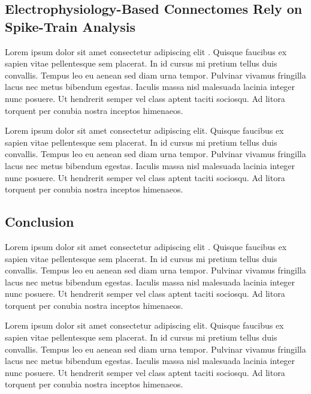 \documentclass[11pt]{article}
\newcommand{\subsectionwithindent}[1]{
    \subsection*{#1}
    \hspace{\parindent} %
}
\begin{document}
\subsectionwithindent{Electrophysiology-Based Connectomes Rely on Spike-Train Analysis}
Lorem ipsum dolor sit amet consectetur adipiscing elit \cite{white1986structure, emmons2015connectomics}. Quisque faucibus ex sapien vitae pellentesque sem placerat. In id cursus mi pretium tellus duis convallis. Tempus leo eu aenean sed diam urna tempor. Pulvinar vivamus fringilla lacus nec metus bibendum egestas. Iaculis massa nisl malesuada lacinia integer nunc posuere. Ut hendrerit semper vel class aptent taciti sociosqu. Ad litora torquent per conubia nostra inceptos himenaeos.

Lorem ipsum dolor sit amet consectetur adipiscing elit. Quisque faucibus ex sapien vitae pellentesque sem placerat. In id cursus mi pretium tellus duis convallis. Tempus leo eu aenean sed diam urna tempor. Pulvinar vivamus fringilla lacus nec metus bibendum egestas. Iaculis massa nisl malesuada lacinia integer nunc posuere. Ut hendrerit semper vel class aptent taciti sociosqu. Ad litora torquent per conubia nostra inceptos himenaeos.

\subsectionwithindent{Conclusion}
Lorem ipsum dolor sit amet consectetur adipiscing elit \cite{white1986structure, emmons2015connectomics}. Quisque faucibus ex sapien vitae pellentesque sem placerat. In id cursus mi pretium tellus duis convallis. Tempus leo eu aenean sed diam urna tempor. Pulvinar vivamus fringilla lacus nec metus bibendum egestas. Iaculis massa nisl malesuada lacinia integer nunc posuere. Ut hendrerit semper vel class aptent taciti sociosqu. Ad litora torquent per conubia nostra inceptos himenaeos.

Lorem ipsum dolor sit amet consectetur adipiscing elit. Quisque faucibus ex sapien vitae pellentesque sem placerat. In id cursus mi pretium tellus duis convallis. Tempus leo eu aenean sed diam urna tempor. Pulvinar vivamus fringilla lacus nec metus bibendum egestas. Iaculis massa nisl malesuada lacinia integer nunc posuere. Ut hendrerit semper vel class aptent taciti sociosqu. Ad litora torquent per conubia nostra inceptos himenaeos.

\newpage
\printbibliography
\end{document}
